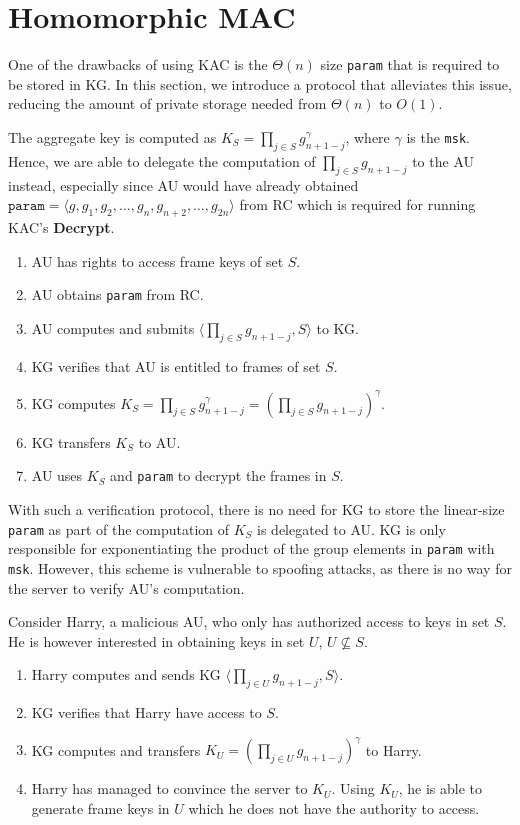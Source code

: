 \documentclass[hyp,a4paper,12pt,openbib]{socreport}
\begin{document}
\section{Homomorphic MAC}
\label{sec:homomophic}
One of the drawbacks of using KAC is the $\Theta(n)$ size \texttt{param} that is required to be stored in KG. In this section, we introduce a protocol that alleviates this issue, reducing the amount of private storage needed from $\Theta(n)$ to $O(1)$. 

The aggregate key is computed as $\displaystyle  K_S = \prod_{j \in S} g^{\gamma}_{n+1-j}$, where $\gamma$ is the \texttt{msk}. Hence, we are able to delegate the computation of  $\displaystyle \prod_{j \in S} g_{n+1-j}$ to the AU instead, especially since AU would have already obtained $\texttt{param} = \langle g, g_1, g_2, \dots, g_n, g_{n+2}, \dots, g_{2n} \rangle$ from RC which is required for running KAC's \textbf{Decrypt}. 

\begin{enumerate}
\item AU has rights to access frame keys of set $S$.
\item AU obtains \texttt{param} from RC.
\item AU computes and submits $\langle \displaystyle \prod_{j \in S} g_{n+1-j}, S \rangle$ to KG.
\item KG verifies that AU is entitled to frames of set $S$.
\item KG computes $K_S = \displaystyle \prod_{j \in S} g^{\gamma}_{n+1-j} = (\displaystyle \prod_{j \in S} g_{n+1-j})^\gamma$.
\item KG transfers $K_S$ to AU.
\item AU uses $K_S$ and \texttt{param} to decrypt the frames in $S$.
\end{enumerate}

With such a verification protocol, there is no need for KG to store the linear-size \texttt{param} as part of the computation of $K_S$ is delegated to AU. KG is only responsible for exponentiating the product of the group elements in \texttt{param} with \texttt{msk}. However, this scheme is vulnerable to spoofing attacks, as there is no way for the server to verify AU's computation.

Consider Harry, a malicious AU, who only has authorized access to keys in set $S$. He is however interested in obtaining keys in set $U$, $U \not\subseteq S$. 

\begin{enumerate}
\item Harry computes and sends KG $\langle \displaystyle \prod_{j \in U} g_{n+1-j}, S \rangle$.
\item KG verifies that Harry have access to $S$.
\item KG computes and transfers $K_{U} = \displaystyle (\prod_{j \in U} g_{n+1-j})^{\gamma}$ to Harry.
\item Harry has managed to convince the server to $K_U$. Using $K_U$, he is able to generate frame keys in $U$ which he does not have the authority to access.
\end{enumerate}
\end{document}
